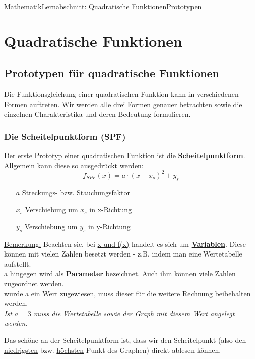 \documentclass[11pt,twocolumn,oneside,openany,headings=optiontotoc,11pt,numbers=noenddot]{article}
\begin{document}
	\begin{worksheet}{Mathematik}{Lernabschnitt: Quadratische Funktionen}{Prototypen}
		\section{Quadratische Funktionen}
		\subsection{Prototypen für quadratische Funktionen}
		Die Funktionsgleichung einer quadratischen Funktion kann in verschiedenen Formen auftreten. Wir werden alle drei Formen genauer betrachten sowie die einzelnen Charakteristika und deren Bedeutung formulieren.
		\subsubsection*{Die Scheitelpunktform (SPF)}
		Der erste Prototyp einer quadratischen Funktion ist die \textbf{Scheitelpunktform}. Allgemein kann diese so ausgedrückt werden: \[f_{SPF}(x) = a\cdot(x-x_s)^2+y_s\]
		\begin{itemize}
			\item[\(a\)] Streckungs- bzw. Stauchungsfaktor
			\item[\(x_s\)] Verschiebung um \(x_s\) in x-Richtung
			\item[\(y_s\)] Verschiebung um \(y_s\) in y-Richtung
		\end{itemize}
		\par\noindent
		\begin{framed}
			\noindent
			\underline{Bemerkung:} Beachten sie, bei \underline{x und f(x)} handelt es sich um \textbf{\underline{Variablen}}. Diese können mit vielen Zahlen besetzt werden - z.B. indem man eine Wertetabelle aufstellt.\\
			\underline{a} hingegen wird als \textbf{\underline{Parameter}} bezeichnet. Auch ihm können viele Zahlen zugeordnet werden.\\ \color{red}{Aber}\normalcolor{} wurde a ein Wert zugewiesen, muss dieser für die weitere Rechnung beibehalten werden.\\ \textit{\small{Ist \(a=3\) muss die Wertetabelle sowie der Graph mit diesem Wert angelegt werden.}}
		\end{framed}
		\noindent
		Das schöne an der Scheitelpunktform ist, dass wir den Scheitelpunkt (also den \underline{niedrigsten} bzw. \underline{höchsten} Punkt des Graphen) direkt ablesen können.\\

\end{worksheet}
\end{document}
